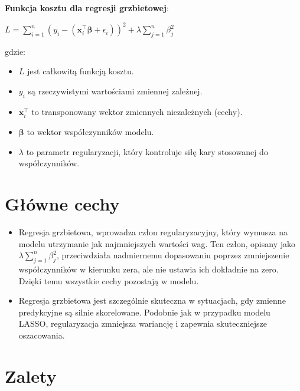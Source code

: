    \textbf{Funkcja kosztu dla regresji grzbietowej}: 
    \begin{center}
        $L = \sum_{i=1}^{n} (y_i - (\boldsymbol{x}_i^{\top} \boldsymbol{\beta} + \epsilon_i))^2 + \lambda \sum_{j=1}^{n} \beta_j^2$
    \end{center}

gdzie:
\begin{itemize}
\setlength\itemsep{-0.5em}
 \item  $L$ jest całkowitą funkcją kosztu.
 \item  $y_i$ są rzeczywistymi wartościami zmiennej zależnej.

 \item  $\boldsymbol{x}_i^{\top}$ to transponowany wektor zmiennych niezależnych (cechy).

 \item  $\boldsymbol{\beta}$ to wektor współczynników modelu.

 \item  $\lambda$ to parametr regularyzacji, który kontroluje siłę kary stosowanej do współczynników.
\end{itemize}
\item 

{}
\section*{Główne cechy}
\vspace{-1.0em}


\begin{itemize}
\item Regresja grzbietowa, wprowadza człon regularyzacyjny, który wymusza na modelu utrzymanie jak najmniejszych wartości wag. Ten człon, opisany jako $\lambda \sum_{j=1}^{n} \beta_j^2$, przeciwdziała nadmiernemu dopasowaniu poprzez zmniejszenie współczynników w kierunku zera, ale nie ustawia ich dokładnie na zero. Dzięki temu wszystkie cechy pozostają w modelu.

\item Regresja grzbietowa jest szczególnie skuteczna w sytuacjach, gdy zmienne predykcyjne są silnie skorelowane. Podobnie jak w przypadku modelu LASSO, regularyzacja zmniejsza wariancję i zapewnia skuteczniejsze oszacowania.
\end{itemize}

{}
\section*{Zalety}
\vspace{-1.0em}



